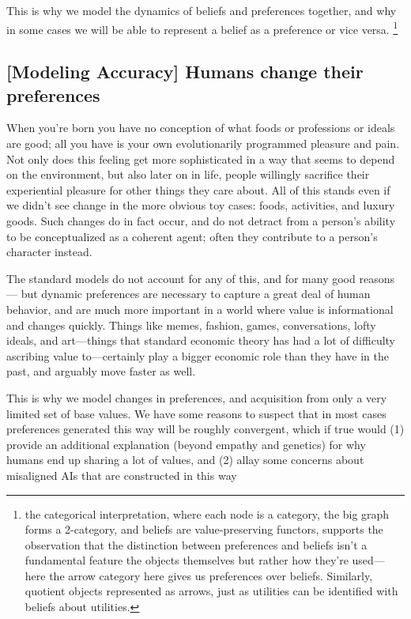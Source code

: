 \documentclass{article}
\begin{document}
	{\color{green!30!black}This is why we model the dynamics of beliefs and preferences together, and why in some cases we will be able to represent a belief as a preference or vice versa. \footnote{the categorical interpretation, where each node is a category, the big graph forms a 2-category, and beliefs are value-preserving functors, supports the observation that the distinction between preferences and beliefs isn't a fundamental feature the objects themselves but rather how they're used--- here the arrow category here gives us preferences over beliefs. Similarly, quotient objects represented as arrows, just as utilities can be identified with beliefs about utilities.}}
	
	\subsection*{[Modeling Accuracy] Humans change their preferences}
	When you're born you have no conception of what foods or professions or ideals are good; all you have is your own evolutionarily programmed pleasure and pain. Not only does this feeling get more sophisticated in a way that seems to depend on the environment, but also later on in life, people willingly sacrifice their experiential pleasure for other things they care about. All of this stands even if we didn't see change in the more obvious toy cases: foods, activities, and luxury goods. Such changes do in fact occur, and do not detract from a person's ability to be conceptualized as a coherent agent; often they contribute to a person's character instead.
	
	The standard models do not account for any of this, and for many good reasons --- but dynamic preferences are necessary to capture a great deal of human behavior, and are much more important in a world where value is informational and changes quickly. Things like memes, fashion, games, conversations, lofty ideals, and art---things that standard economic theory has had a lot of difficulty ascribing value to---certainly play a bigger economic role than they have in the past, and arguably move faster as well.
	
	{\color{green!30!black}This is why we model changes in preferences, and acquisition from only a very limited set of base values. We have some reasons to suspect that in most cases preferences generated this way will be roughly convergent, which if true would (1) provide an additional explanation (beyond empathy and genetics) for why humans end up sharing a lot of values, and (2) allay some concerns about misaligned AIs that are constructed in this way}
	
\end{document}
